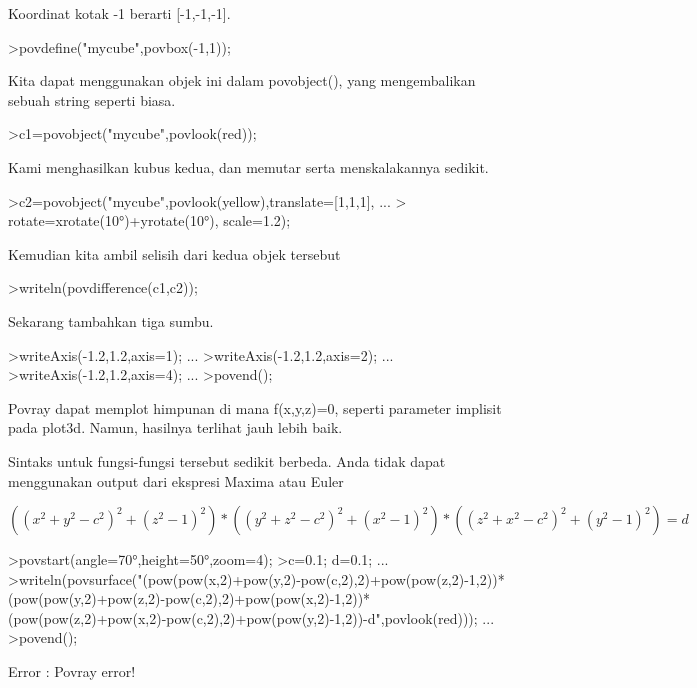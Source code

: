 \documentclass{article}
\begin{document}
\begin{eulernotebook}
\begin{eulercomment}
\begin{eulercomment}
\begin{eulercomment}
Koordinat kotak -1 berarti [-1,-1,-1].

\end{eulercomment}
\begin{eulerprompt}
>povdefine("mycube",povbox(-1,1));
\end{eulerprompt}
\begin{eulercomment}
Kita dapat menggunakan objek ini dalam povobject(), yang mengembalikan
sebuah string seperti biasa.
\end{eulercomment}
\begin{eulerprompt}
>c1=povobject("mycube",povlook(red));
\end{eulerprompt}
\begin{eulercomment}
Kami menghasilkan kubus kedua, dan memutar serta menskalakannya
sedikit.
\end{eulercomment}
\begin{eulerprompt}
>c2=povobject("mycube",povlook(yellow),translate=[1,1,1], ...
>  rotate=xrotate(10°)+yrotate(10°), scale=1.2);
\end{eulerprompt}
\begin{eulercomment}
Kemudian kita ambil selisih dari kedua objek tersebut
\end{eulercomment}
\begin{eulerprompt}
>writeln(povdifference(c1,c2));
\end{eulerprompt}
\begin{eulercomment}
Sekarang tambahkan tiga sumbu.
\end{eulercomment}
\begin{eulerprompt}
>writeAxis(-1.2,1.2,axis=1); ...
>writeAxis(-1.2,1.2,axis=2); ...
>writeAxis(-1.2,1.2,axis=4); ...
>povend();
\end{eulerprompt}
\begin{eulercomment}
Povray dapat memplot himpunan di mana f(x,y,z)=0, seperti parameter
implisit pada plot3d. Namun, hasilnya terlihat jauh lebih baik.

Sintaks untuk fungsi-fungsi tersebut sedikit berbeda. Anda tidak dapat
menggunakan output dari ekspresi Maxima atau Euler

\end{eulercomment}
\begin{eulerformula}
\[
((x^2+y^2-c^2)^2+(z^2-1)^2)*((y^2+z^2-c^2)^2+(x^2-1)^2)*((z^2+x^2-c^2)^2+(y^2-1)^2)=d
\]
\end{eulerformula}
\begin{eulerprompt}
>povstart(angle=70°,height=50°,zoom=4);
>c=0.1; d=0.1; ...
>writeln(povsurface("(pow(pow(x,2)+pow(y,2)-pow(c,2),2)+pow(pow(z,2)-1,2))*(pow(pow(y,2)+pow(z,2)-pow(c,2),2)+pow(pow(x,2)-1,2))*(pow(pow(z,2)+pow(x,2)-pow(c,2),2)+pow(pow(y,2)-1,2))-d",povlook(red))); ...
>povend();
\end{eulerprompt}
\begin{euleroutput}
  Error : Povray error!
  

\end{euleroutput}
\end{eulercomment}
\end{eulercomment}
\end{eulernotebook}
\end{document}
